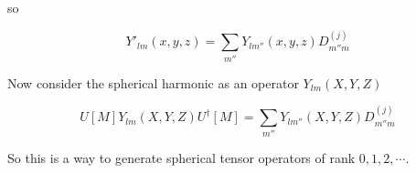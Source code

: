 so

\begin{equation}\label{eqn:qmTwoL19:390}
Y'_{l m}(x, y, z)
= 
\sum_{m''} 
Y_{l m''}(x, y, z)
D^{(j)}_{m'' m} 
\end{equation}

Now consider the spherical harmonic as an operator $Y_{l m}(X, Y, Z)$

\begin{equation}\label{eqn:qmTwoL19:410}
U[M] Y_{lm}(X, Y, Z) U^\dagger[M] =
\sum_{m''} 
Y_{l m''}(X, Y, Z)
D^{(j)}_{m'' m} 
\end{equation}

So this is a way to generate spherical tensor operators of rank $0, 1, 2, \cdots$.  

\EndArticle
